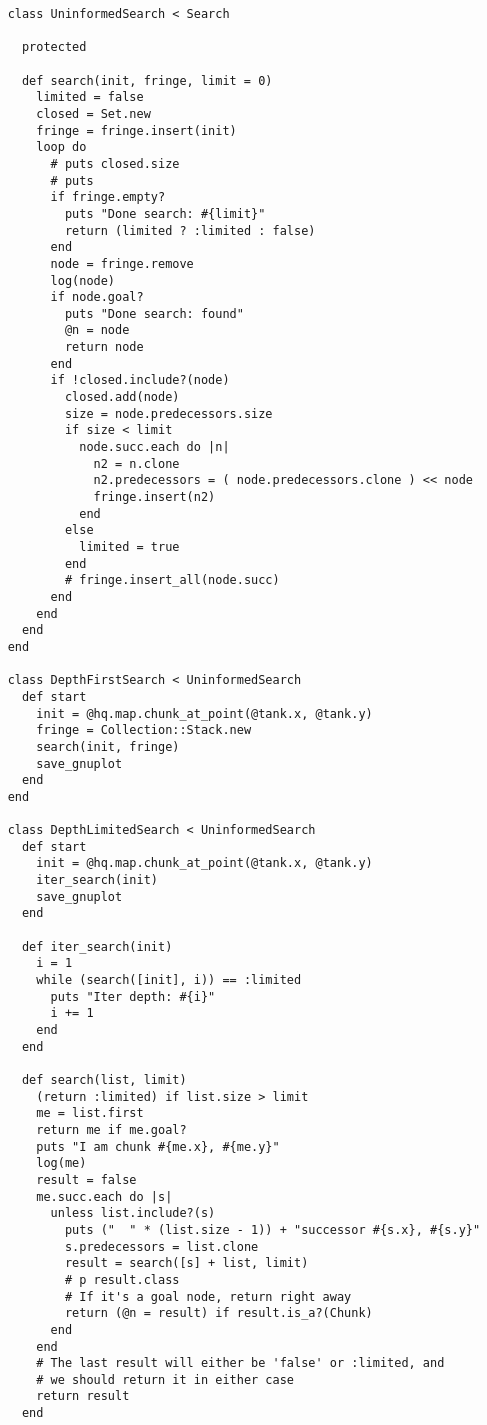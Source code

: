 \begin{verbatim}
    class UninformedSearch < Search

      protected

      def search(init, fringe, limit = 0)
        limited = false
        closed = Set.new
        fringe = fringe.insert(init)
        loop do
          # puts closed.size
          # puts
          if fringe.empty?
            puts "Done search: #{limit}"
            return (limited ? :limited : false)
          end
          node = fringe.remove
          log(node)
          if node.goal?
            puts "Done search: found"
            @n = node
            return node
          end
          if !closed.include?(node)
            closed.add(node)
            size = node.predecessors.size
            if size < limit
              node.succ.each do |n|
                n2 = n.clone
                n2.predecessors = ( node.predecessors.clone ) << node
                fringe.insert(n2)
              end
            else
              limited = true
            end
            # fringe.insert_all(node.succ)
          end
        end
      end
    end

    class DepthFirstSearch < UninformedSearch
      def start
        init = @hq.map.chunk_at_point(@tank.x, @tank.y)
        fringe = Collection::Stack.new
        search(init, fringe)
        save_gnuplot
      end
    end

    class DepthLimitedSearch < UninformedSearch
      def start
        init = @hq.map.chunk_at_point(@tank.x, @tank.y)
        iter_search(init)
        save_gnuplot
      end

      def iter_search(init)
        i = 1
        while (search([init], i)) == :limited
          puts "Iter depth: #{i}"
          i += 1
        end
      end

      def search(list, limit)
        (return :limited) if list.size > limit
        me = list.first
        return me if me.goal?
        puts "I am chunk #{me.x}, #{me.y}"
        log(me)
        result = false
        me.succ.each do |s|
          unless list.include?(s)
            puts ("  " * (list.size - 1)) + "successor #{s.x}, #{s.y}"
            s.predecessors = list.clone
            result = search([s] + list, limit)
            # p result.class
            # If it's a goal node, return right away
            return (@n = result) if result.is_a?(Chunk)
          end
        end
        # The last result will either be 'false' or :limited, and
        # we should return it in either case
        return result
      end


\end{verbatim}
